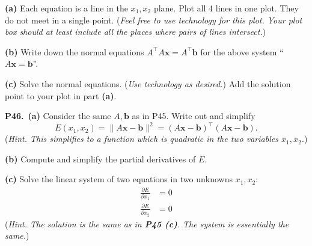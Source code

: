 \documentclass[12pt]{amsart}
\newcommand{\bb}{\bm{b}}
\newcommand{\bx}{\bm{x}}
\newcommand{\prob}[1]{\bigskip\noindent\textbf{#1.}\quad }
\newcommand{\epart}[1]{\medskip\noindent\textbf{(#1)}\quad }
\newcommand{\ppart}[1]{\,\textbf{(#1)}\quad }
\begin{document}
\epart{a} Each equation is a line in the $x_1,x_2$ plane.  Plot all 4 lines in one plot.  They do not meet in a single point.  (\emph{Feel free to use technology for this plot.  Your plot box should at least include all the places where pairs of lines intersect.})

\epart{b} Write down the normal equations $A^\top A \bx = A^\top \bb$ for the above system ``$A\bx = \bb$''.

\epart{c} Solve the normal equations.  (\emph{Use technology as desired.})  Add the solution point to your plot in part \textbf{(a)}.


\prob{P46}  \ppart{a}  Consider the same $A,\bb$ as in P45.  Write out and simplify
    $$E(x_1,x_2) = \|A\bx - \bb\|^2 = (A\bx - \bb)^\top (A\bx - \bb).$$
(\emph{Hint.  This simplifies to a function which is quadratic in the two variables $x_1,x_2$.})

\epart{b}  Compute and simplify the partial derivatives of $E$.

\epart{c}  Solve the linear system of two equations in two unknowns $x_1,x_2$:
\begin{align*}
\frac{\partial E}{\partial x_1} &= 0 \\
\frac{\partial E}{\partial x_2} &= 0
\end{align*}
(\emph{Hint.  The solution is the same as in \textbf{P45 (c)}.  The system is essentially the same.})
\end{document}
